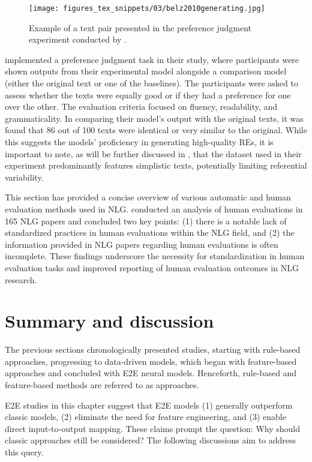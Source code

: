 \begin{figure}
\captionsetup{font=scriptsize}
    \centering
    \texttt{[image: figures\_tex\_snippets/03/belz2010generating.jpg]}
    \caption[Example of a text pair.]{Example of a text pair presented in the preference judgment experiment conducted by \citet{belz2010generating}.}
    \label{fig:humanevaluation}
\end{figure}

\citet{cao2019referring} implemented a preference judgment task in their study, where participants were shown outputs from their experimental model alongside a comparison model (either the original text or one of the baselines). The participants were asked to assess whether the texts were equally good or if they had a preference for one over the other. The evaluation criteria focused on fluency, readability, and grammaticality. In comparing their model's output with the original texts, it was found that 86 out of 100 texts were identical or very similar to the original. While this suggests the models' proficiency in generating high-quality REs, it is important to note, as will be further discussed in , that the \webnlg dataset used in their experiment predominantly features simplistic texts, potentially limiting referential variability.

This section has provided a concise overview of various automatic and human evaluation methods used in NLG. \citet{howcroft-etal-2020-twenty} conducted an analysis of human evaluations in 165 NLG papers and concluded two key points: (1) there is a notable lack of standardized practices in human evaluations within the NLG field, and (2) the information provided in NLG papers regarding human evaluations is often incomplete. These findings underscore the necessity for standardization in human evaluation tasks and improved reporting of human evaluation outcomes in NLG research.


\section{Summary and discussion}\label{sec:summarychap3}

The previous sections chronologically presented \context studies, starting with rule-based approaches, progressing to data-driven models, which began with feature-based approaches and concluded with E2E neural models. Henceforth, rule-based and feature-based methods are referred to as  approaches.

E2E studies in this chapter suggest that E2E models (1) generally outperform classic \context models, (2) eliminate the need for feature engineering, and (3) enable direct input-to-output mapping. These claims prompt the question: Why should classic \context approaches still be considered? The following discussions aim to address this query.

